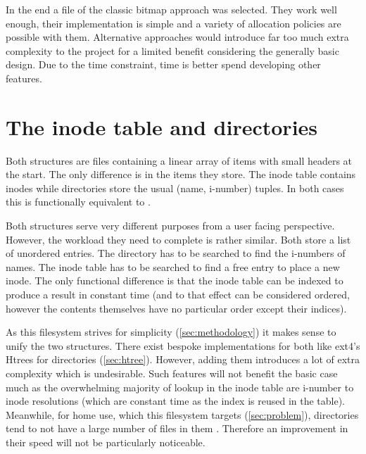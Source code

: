         In the end a file of the classic bitmap approach was selected. They
        work well enough, their implementation is simple and a variety of
        allocation policies are possible with them. Alternative approaches
        would introduce far too much extra complexity to the project for a
        limited benefit considering the generally basic design. Due to the time
        constraint, time is better spend developing other features.

    \section{The inode table and directories}

        Both structures are files containing a linear array of items with small
        headers at the start. The only difference is in the items they store.
        The inode table contains inodes while directories store the usual
        (name, i-number) tuples. In both cases this is functionally equivalent
        to .

        Both structures serve very different purposes from a user facing
        perspective. However, the workload they need to complete is rather
        similar. Both store a list of unordered entries. The directory has to be
        searched to find the i-numbers of names. The inode table has to be
        searched to find a free entry to place a new inode. The only functional
        difference is that the inode table can be indexed to produce a result
        in constant time (and to that effect can be considered ordered, however
        the contents themselves have no particular order except their indices).

        As this filesystem strives for simplicity (\autoref{sec:methodology}) it
        makes sense to unify the two structures. There exist bespoke
        implementations for both like ext4's Htrees for directories
        (\autoref{sec:htree}). However, adding them introduces a lot of extra
        complexity which is undesirable. Such features will not benefit the
        basic case much as the overwhelming majority of lookup in the inode
        table are i-number to inode resolutions (which are constant time as the
        index is reused in the table). Meanwhile, for home use, which this
        filesystem targets (\autoref{sec:problem}), directories tend to not have a
        large number of files in them \cite{contents_study}. Therefore an
        improvement in their speed will not be particularly noticeable.

